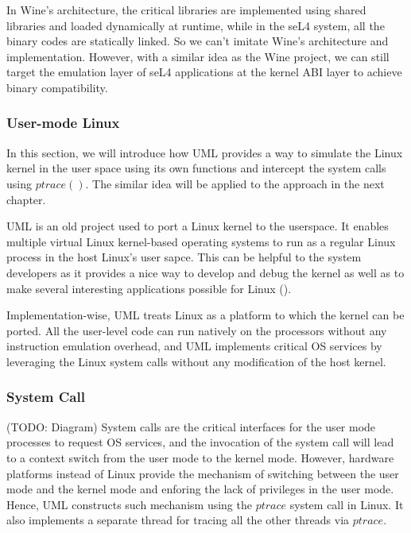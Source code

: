 In Wine's architecture, the critical libraries are implemented using shared libraries and loaded dynamically at runtime, while in the seL4 system, all the binary codes are statically linked. So we can't imitate Wine's architecture and implementation. However, with a similar idea as the Wine project, we can still target the emulation layer of seL4 applications at the kernel ABI layer to achieve binary compatibility.

\subsubsection{User-mode Linux}


In this section, we will introduce how UML provides a way to simulate the Linux kernel in the user space using its own functions and intercept the system calls using $ptrace()$. The similar idea will be applied to the approach in the next chapter.

UML is an old project used to port a Linux kernel to the userspace. It enables multiple virtual Linux kernel-based operating systems to run as a regular Linux process in the host Linux's user sapce. This can be helpful to the system developers as it provides a nice way to develop and debug the kernel as well as to make several interesting applications possible for Linux (\cite{JD06}). 


Implementation-wise, UML treats Linux as a platform to which the kernel can be ported. All the user-level code can run natively on the processors without any instruction emulation overhead, and UML implements critical OS services by leveraging the Linux system calls without any modification of the host kernel.  

\subsubsection{System Call}

(TODO: Diagram)
System calls are the critical interfaces for the user mode processes to request OS services, and the invocation of the system call will lead to a context switch from the user mode to the kernel mode. However, hardware platforms instead of Linux provide the mechanism of switching between the user mode and the kernel mode and enforing the lack of privileges in the user mode. Hence, UML constructs such mechanism using the $ptrace$ system call in Linux. It also implements a separate thread for tracing all the other threads via $ptrace$. 

